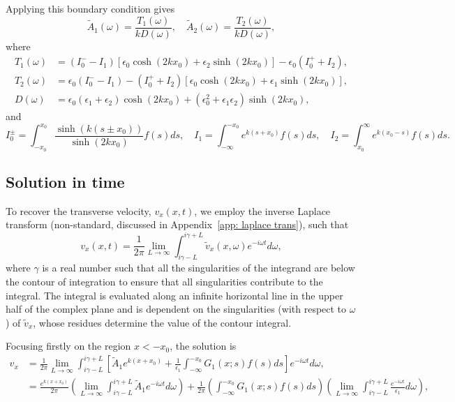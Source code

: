\documentclass{aastex61}
\begin{document}
Applying this boundary condition gives
\begin{equation}
\tilde{A}_1(\omega) = \frac{T_1(\omega)}{k D(\omega)}, \quad \tilde{A}_2(\omega) = \frac{T_2(\omega)}{k D(\omega)},
\end{equation}
where
\begin{align}
T_1(\omega) & = (I_0^- - I_1)[\epsilon_0\cosh(2kx_0) + \epsilon_2\sinh(2kx_0)] - \epsilon_0(I_0^+ + I_2), \\
T_2(\omega) & = \epsilon_0(I_0^- - I_1) - (I_0^+ + I_2)[\epsilon_0\cosh(2kx_0) + \epsilon_1\sinh(2kx_0)], \\
D(\omega) & = \epsilon_0(\epsilon_1 + \epsilon_2)\cosh(2kx_0) + (\epsilon_0^2 + \epsilon_1\epsilon_2)\sinh(2kx_0),
\label{D incomp}
\end{align}
and
\begin{equation}
I_0^\pm = \int_{-x_0}^{x_0} \frac{\sinh(k(s \pm x_0))}{\sinh(2kx_0)} f(s) ds,
\quad
I_1 = \int_{-\infty}^{-x_0} e^{k(s + x_0)} f(s) ds,
\quad
I_2 = \int_{x_0}^\infty e^{k(x_0 - s)} f(s) ds.
\end{equation}


\subsection{Solution in time}

To recover the transverse velocity, $v_x(x, t)$, we employ the inverse Laplace transform (non-standard, discussed in Appendix~\ref{app: laplace trans}), such that
\begin{equation}
v_x(x,t) = \frac{1}{2\pi} \lim_{L \to \infty} \int_{i\gamma - L}^{i\gamma + L} \tilde{v}_x(x,\omega) e^{-i\omega t} d\omega,
\label{laplace transform}
\end{equation}
where $\gamma$ is a real number such that all the singularities of the integrand are below the contour of integration to ensure that all singularities contribute to the integral. The integral is evaluated along an infinite horizontal line in the upper half of the complex plane and is dependent on the singularities (with respect to $\omega$) of $\tilde{v}_x$, whose residues determine the value of the contour integral.

Focusing firstly on the region $x<-x_0$, the solution is
\newcommand{\e}{\epsilon}
\begin{align}
v_x &= \frac{1}{2\pi} \lim_{L \to \infty} \int_{i\gamma - L}^{i\gamma + L} \left[ \tilde{A}_1 e^{k(x+x_0)} + \frac{1}{\e_1} \int_{-\infty}^{-x_0} G_1(x;s)f(s)ds \right]e^{-i\omega t} d\omega, \\
&= \frac{e^{k(x+x_0)}}{2\pi} \left( \lim_{L \to \infty} \int_{i\gamma - L}^{i\gamma + L} \tilde{A}_1 e^{-i\omega t} d\omega \right) + \frac{1}{2\pi} \left(\int_{-\infty}^{-x_0} G_1(x;s)f(s)ds \right) \left( \lim_{L \to \infty} \int_{i\gamma - L}^{i\gamma + L} \frac{e^{-i\omega t}}{\e_1} d\omega \right),
\label{sol incomp}
\end{align}
\end{document}
